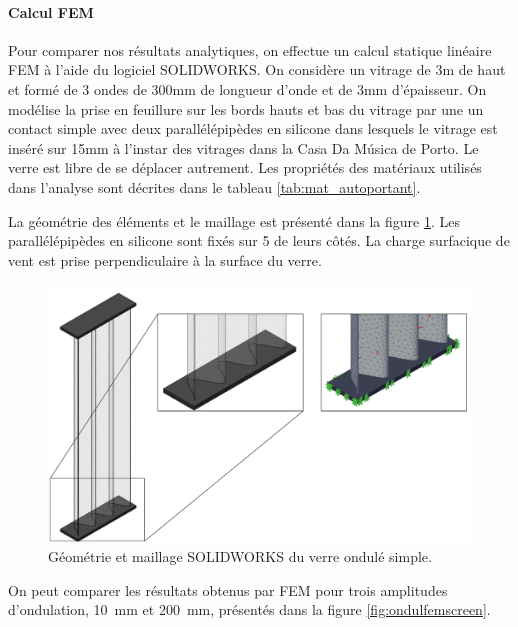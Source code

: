 \documentclass[11pt,titlepage]{article}
\begin{document}
\paragraph{Calcul \acrshort{FEM}}\mbox{}

Pour comparer nos résultats analytiques, on effectue un calcul statique linéaire \acrshort{FEM} à l'aide du logiciel SOLIDWORKS. On considère un vitrage de 3m de haut et formé de 3 ondes de 300mm de longueur d'onde et de 3mm d'épaisseur. On modélise la prise en feuillure sur les bords hauts et bas du vitrage par une un contact simple avec deux parallélépipèdes en silicone dans lesquels le vitrage est inséré sur 15mm à l'instar des vitrages dans la Casa Da Música de Porto. Le verre est libre de se déplacer autrement. Les propriétés des matériaux utilisés dans l'analyse sont décrites dans le tableau \ref{tab:mat_autoportant}.

La géométrie des éléments et le maillage est présenté dans la figure \ref{fig:ondulmaill}. Les parallélépipèdes en silicone sont fixés sur 5 de leurs côtés. La charge surfacique de vent est prise perpendiculaire à la surface du verre.

\begin{figure}[H]
    \centering
    \includegraphics[width=0.8\linewidth]{img/ondul/fem/maillage_simple.pdf}
    \caption{Géométrie et maillage SOLIDWORKS du verre ondulé simple.}
    \label{fig:ondulmaill}
\end{figure}

On peut comparer les résultats obtenus par \acrshort{FEM} pour trois amplitudes d'ondulation, \qty{10}{\milli\meter} et \qty{200}{\milli\meter}, présentés dans la figure \ref{fig:ondulfemscreen}. 
\end{document}
